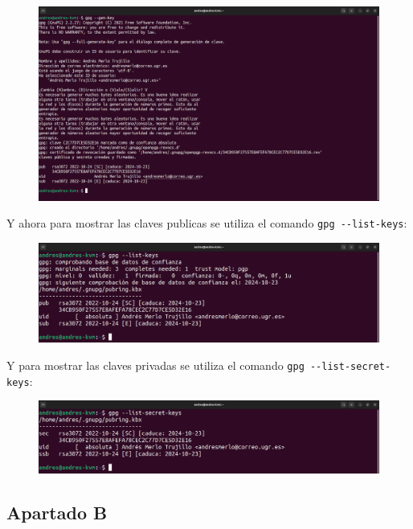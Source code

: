 \documentclass{article}
\begin{document}
\begin{figure}[H]
    \includegraphics[width=\textwidth]{imagenes/Portatil/Captura desde 2022-10-24 11-46-02.png}
\end{figure}

Y ahora para mostrar las claves publicas se utiliza el comando \verb|gpg --list-keys|:

\begin{figure}[H]
    \includegraphics[width=\textwidth]{imagenes/Portatil/Captura desde 2022-10-24 11-46-16.png}
\end{figure}

Y para mostrar las claves privadas se utiliza el comando \verb|gpg --list-secret-keys|:

\begin{figure}[H]
    \includegraphics[width=\textwidth]{imagenes/Portatil/Captura desde 2022-10-24 11-46-25.png}
\end{figure}

\subsection*{Apartado B}
\end{document}
